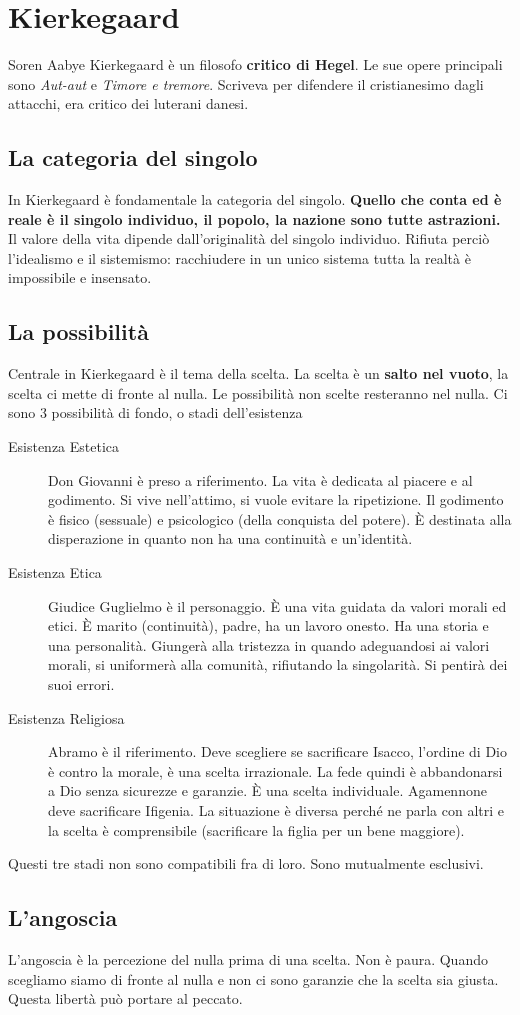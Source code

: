 
\section{Kierkegaard}
Soren Aabye Kierkegaard è un filosofo \textbf{critico di Hegel}. Le sue opere principali sono
\textit{Aut-aut} e \textit{Timore e tremore}. Scriveva per difendere il cristianesimo dagli attacchi,
era critico dei luterani danesi.

\subsection{La categoria del singolo}
In Kierkegaard è fondamentale la categoria del singolo. \textbf{Quello che conta ed è reale è il 
singolo individuo, il popolo, la nazione sono tutte astrazioni.} Il valore della vita dipende 
dall'originalità del singolo individuo. Rifiuta perciò l'idealismo e il sistemismo: racchiudere in un
unico sistema tutta la realtà è impossibile e insensato.

\subsection{La possibilità}
Centrale in Kierkegaard è il tema della scelta. La scelta è un \textbf{salto nel vuoto}, la scelta
ci mette di fronte al nulla. Le possibilità non scelte resteranno nel nulla. Ci sono 3 possibilità
di fondo, o stadi dell'esistenza
\begin{description}
  \item[Esistenza Estetica] Don Giovanni è preso a riferimento. La vita è dedicata al piacere e al
    godimento. Si vive nell'attimo, si vuole evitare la ripetizione. Il godimento è fisico (sessuale)
    e psicologico (della conquista del potere). È destinata alla disperazione in quanto non ha una
    continuità e un'identità.
  \item[Esistenza Etica] Giudice Guglielmo è il personaggio. È una vita guidata da valori morali ed
    etici. È marito (continuità), padre, ha un lavoro onesto. Ha una storia e una personalità. 
    Giungerà alla tristezza in quando adeguandosi ai valori morali, si uniformerà alla comunità,
    rifiutando la singolarità. Si pentirà dei suoi errori.
  \item[Esistenza Religiosa] Abramo è il riferimento. Deve scegliere se sacrificare Isacco, l'ordine
    di Dio è contro la morale, è una scelta irrazionale. La fede quindi è abbandonarsi a Dio senza
    sicurezze e garanzie. È una scelta individuale. Agamennone deve sacrificare Ifigenia. La 
    situazione è diversa perché ne parla con altri e la scelta è comprensibile (sacrificare la figlia
    per un bene maggiore).
\end{description}
Questi tre stadi non sono compatibili fra di loro. Sono mutualmente esclusivi.

\subsection{L'angoscia}
L'angoscia è la percezione del nulla prima di una scelta. Non è paura. Quando scegliamo siamo di 
fronte al nulla e non ci sono garanzie che la scelta sia giusta. Questa libertà può portare al 
peccato.
